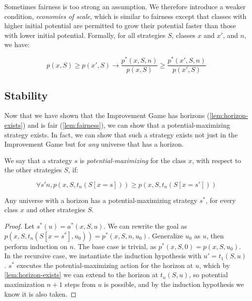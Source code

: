 Sometimes fairness is too strong an assumption. We therefore introduce a weaker
condition, \emph{economies of scale}, which is similar to fairness except that
classes with higher initial potential are permitted to grow their potential
faster than those with lower initial potential. Formally, for all strategies
$S$, classes $x$ and $x'$, and $n$, we have:

\begin{equation}
  p(x,S) \ge
  p(x',S) \rightarrow
  \frac{p^*(x,S,n)}{p(x,S)} \ge
  \frac{p^*(x',S,n)}{p(x',S)}
\end{equation}

\subsection{Stability}
\label{sec:stability}

Now that we have shown that the Improvement Game has horizons
(\cref{lem:horizon-exists}) and is fair (\cref{lem:fairness}), we can show that
a potential-maximizing strategy exists. In fact, we can show that such a
strategy exists not just in the Improvement Game but for \emph{any} universe
that has a horizon.

We say that a strategy $s$ is \emph{potential-maximizing} for the class $x$,
with respect to the other strategies $S$, if:

\begin{equation}
  \forall s' n, p(x, S, t_n(S[x=s])) \ge p(x, S, t_n(S[x=s']))
\end{equation}

\begin{theorem}
  \label{lem:potential-maximizing-strategy-ok}
  Any universe with a horizon has a potential-maximizing strategy
  $s^*$, for every class $x$ and other strategies $S$.
\end{theorem}

\begin{proof}
  Let $s^*(u) = a^*(x,S,u)$. We can rewrite the goal as $p(x,S,t_n(S[x=s^*],
    u_0)) = p^*(x,S,n,u_0)$. Generalize $u_0$ as $u$, then perform induction on
  $n$. The base case is trivial, as $p^*(x,S,0) = p(x,S,u_0)$. In the
  recursive case, we instantiate the induction hypothesis with $u' = t_1(S,
    u)$. $s^*$ executes the potential-maximizing action for the horizon at $u$,
  which by \cref{lem:horizon-exists} we can extend to the horizon at
  $t_n(S,u)$, so potential maximization $n+1$ steps from $u$ is possible, and
  by the induction hypothesis we know it is also taken.
\end{proof}

